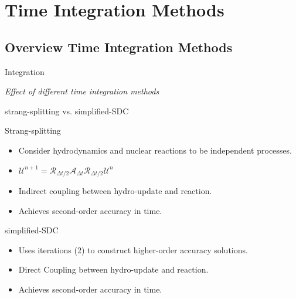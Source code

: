 \documentclass[
	11pt, %
]{beamer}
\begin{document}
\section{Time Integration Methods}
\subsection{Overview Time Integration Methods}


\begin{frame}{Integration}
    \begin{center}
        \Huge {\it Effect of different time integration methods}
    \end{center}
\end{frame}


\begin{frame}{strang-splitting vs. simplified-SDC}

    \begin{block}{Strang-splitting}
        \begin{itemize}
            \item Consider hydrodynamics and nuclear reactions to be independent processes.
            \item $\mathcal{U}^{n+1} = \mathcal{R}_{\Delta t/2} \mathcal{A}_{\Delta t} \mathcal{R}_{\Delta t/2} \mathcal{U}^n$
            \item Indirect coupling between hydro-update and reaction.
            \item Achieves second-order accuracy in time.

        \end{itemize}
    \end{block}
    
    \begin{block}{simplified-SDC}
        \begin{itemize}
            \item Uses iterations (2) to construct higher-order accuracy solutions.
            \item Direct Coupling between hydro-update and reaction.
            \item Achieves second-order accuracy in time.
        \end{itemize}
    \end{block}

\end{frame}
\end{document}
